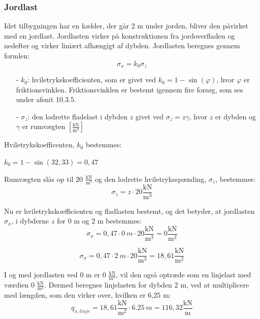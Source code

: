 \subsubsection{Jordlast}
Idet tilbygningen har en kælder, der går 2 m under jorden, bliver den påvirket med en jordlast. Jordlasten virker på konstruktionen fra jordoverfladen og nedefter og virker liniært afhængigt af dybden.
\newline
\newline
Jordlasten beregnes gennem formlen:
\begin{equation}
	\sigma_x = k_0 \sigma_z
\end{equation}

\begin{itemize}
	\item[-] $k_0$: hviletrykskoefficienten, som er givet ved $k_0=1-\sin(\varphi)$, hvor $\varphi$ er friktionsvinklen. Friktionsvinklen er bestemt igennem fire forsøg, som ses under afsnit 10.3.5. 
	\item[-] $\sigma_z$: den lodrette fladelast i dybden $z$ givet ved $\sigma_z = z\gamma$, hvor $z$ er dybden og $\gamma$ er rumvægten $[\frac{\text{kN}}{\text{m}^3}]$
\end{itemize}

Hviletrykskoefficenten, $k_0$ bestemmes:
\begin{center}
	$k_0 = 1 - \sin(32,\!33) = 0,\!47$
\end{center}

Rumvægten slås op til 20 $\frac{\text{kN}}{\text{m}^3}$ \citep[ s. 386]{stabi} og den lodrette hviletryksspænding, $\sigma_z$, bestemmes:
\begin{equation}
	\sigma_z = z\cdot 20 \frac{\text{kN}}{\text{m}^3}
\end{equation}

Nu er hviletrykskoefficienten og fladlasten bestemt, og det betyder, at jordlasten $\sigma_x$, i dybderne $z$ for 0 m og 2 m bestemmes:
\begin{equation}
	\sigma_x = 0,\!47\cdot \SI{0}{m}\cdot 20 \frac{\text{kN}}{\text{m}^3} = 0 \frac{\text{kN}}{\text{m}^2}
\end{equation}

\begin{equation}
	\sigma_x = 0,\!47\cdot \SI{2}{m}\cdot 20 \frac{\text{kN}}{\text{m}^3} = 18,\!61 \frac{\text{kN}}{\text{m}^2}
\end{equation}

I og med jordlasten ved 0 m er 0 $\frac{\text{kN}}{\text{m}^2}$, vil den også optræde som en linjelast med værdien 0 $\frac{\text{kN}}{\text{m}^2}$. Dermed beregnes linjelasten for dybden 2 m, ved at multiplicere med længden, som den virker over, hvilken er 6,25 m:
\begin{equation}
	q_{x,linje} = 18,\!61 \frac{\text{kN}}{\text{m}^2}\cdot \SI{6,25}{m} = 116,\!32 \frac{\text{kN}}{\text{m}}
\end{equation}

